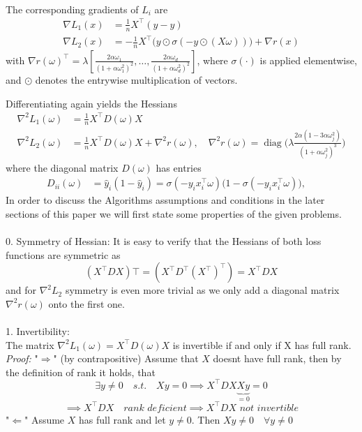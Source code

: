 \documentclass{article}
\begin{document}
\\
The corresponding gradients of $L_i$ are
\begin{align}
\nabla L_1(x) &= \frac{1}{n} X^\top (\hat{y} - y) \\
\nabla L_2(x) &= -\frac{1}{n} X^\top \big(y \odot \sigma(-y \odot (X\omega))\big) + \nabla r(x)
\end{align}
with $\nabla r(\omega)^\top = \lambda \left[ \frac{2\alpha \omega_1}{(1 + \alpha \omega_1^2)^2}, \ldots, \frac{2\alpha \omega_d}{(1 + \alpha \omega_d^2)^2} \right]$, where $\sigma(\cdot)$ is applied elementwise, and $\odot$ denotes the entrywise multiplication of vectors.


Differentiating again yields the Hessians
\begin{align}
\nabla^2 L_1(\omega) &= \frac{1}{n} X^\top D (\omega) X\\
\nabla^2 L_2(\omega) &= \frac{1}{n} X^\top D(\omega) X + \nabla^2 r(\omega), \quad
\nabla ^2 r(\omega) = \operatorname{diag}\Big(\lambda \frac{2\alpha (1 - 3\alpha \omega_j^2)}{(1 + \alpha \omega_j^2)^3}\Big)
\end{align}
where the diagonal matrix $D(\omega)$ has entries
\begin{align}
D_{ii}(\omega) &= \hat{y}_i (1 - \hat{y}_i)=  \sigma(-y_i x_i^\top \omega) \big(1 - \sigma(-y_i x_i^\top \omega)\big),\quad 
\end{align}
In order to discuss the Algorithms assumptions and conditions in the later sections of this paper we will first state some properties of the given problems.\\
\\
0. Symmetry of Hessian:
It is easy to verify that the Hessians of both loss functions are symmetric as
$$ (X^\top D X) \top = (X^\top D^\top (X ^\top)^\top)  = X^\top D X$$
and for $\nabla^2 L_2 $ symmetry is even more trivial as we only add a diagonal matrix $\nabla ^2 r(\omega)$ onto the first one.\\
\\
1. Invertibility:\\
The matrix $ \nabla ^2 L_1(\omega) = X^\top D(\omega)X$ is invertible if and only if X has full rank.\\
\textit{Proof:}
"$ \Longrightarrow$" (by contrapositive)
Assume that $X$ doesnt have full rank, then by the definition of rank it holds, that
$$ \exists y \neq 0 \quad s.t. \quad Xy = 0 \implies X^\top DX\underbrace{Xy}_{=0} =0 $$
$$\implies X^\top DX \quad \textit{rank deficient} \implies X^\top DX \textit{ not invertible} $$
"$\Longleftarrow$" Assume $X$ has full rank and let $y\neq 0$. Then $ Xy \neq 0 \quad \forall y \neq 0$
\end{document}
